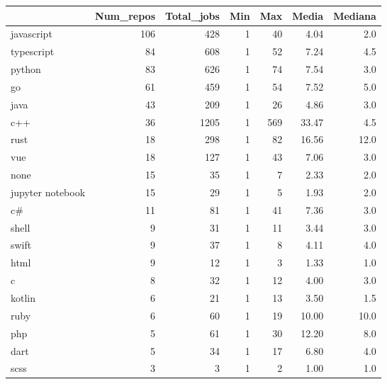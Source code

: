 \begin{tabular}{lrrrrrr}
\toprule
{} &  Num\_repos &  Total\_jobs &  Min &  Max &  Media &  Mediana \\
\midrule
javascript       &        106 &         428 &    1 &   40 &   4.04 &      2.0 \\
typescript       &         84 &         608 &    1 &   52 &   7.24 &      4.5 \\
python           &         83 &         626 &    1 &   74 &   7.54 &      3.0 \\
go               &         61 &         459 &    1 &   54 &   7.52 &      5.0 \\
java             &         43 &         209 &    1 &   26 &   4.86 &      3.0 \\
c++              &         36 &        1205 &    1 &  569 &  33.47 &      4.5 \\
rust             &         18 &         298 &    1 &   82 &  16.56 &     12.0 \\
vue              &         18 &         127 &    1 &   43 &   7.06 &      3.0 \\
none             &         15 &          35 &    1 &    7 &   2.33 &      2.0 \\
jupyter notebook &         15 &          29 &    1 &    5 &   1.93 &      2.0 \\
c\#               &         11 &          81 &    1 &   41 &   7.36 &      3.0 \\
shell            &          9 &          31 &    1 &   11 &   3.44 &      3.0 \\
swift            &          9 &          37 &    1 &    8 &   4.11 &      4.0 \\
html             &          9 &          12 &    1 &    3 &   1.33 &      1.0 \\
c                &          8 &          32 &    1 &   12 &   4.00 &      3.0 \\
kotlin           &          6 &          21 &    1 &   13 &   3.50 &      1.5 \\
ruby             &          6 &          60 &    1 &   19 &  10.00 &     10.0 \\
php              &          5 &          61 &    1 &   30 &  12.20 &      8.0 \\
dart             &          5 &          34 &    1 &   17 &   6.80 &      4.0 \\
scss             &          3 &           3 &    1 &    2 &   1.00 &      1.0 \\

\end{tabular}
